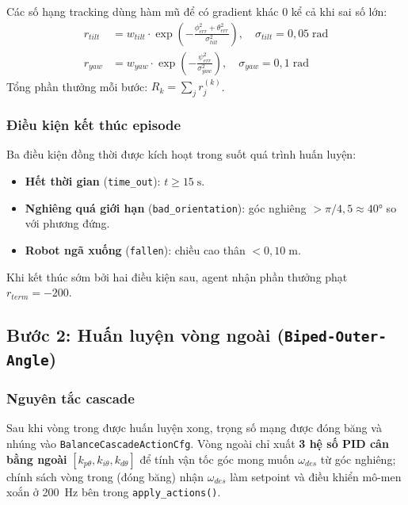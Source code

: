 Các số hạng tracking dùng hàm mũ để có gradient khác 0 kể cả khi sai
số lớn:
\begin{align}
    r_{tilt} &= w_{tilt} \cdot \exp\!\left(-\frac{\phi_{err}^2 + \theta_{err}^2}{\sigma_{tilt}^2}\right),
    \quad \sigma_{tilt} = 0{,}05\;\text{rad}
    \label{eq:rew_tilt_exp} \\
    r_{yaw}  &= w_{yaw} \cdot \exp\!\left(-\frac{\psi_{err}^2}{\sigma_{yaw}^2}\right),
    \quad \sigma_{yaw} = 0{,}1\;\text{rad}
    \label{eq:rew_yaw_exp}
\end{align}
Tổng phần thưởng mỗi bước: $R_k = \sum_j r_j^{(k)}$.

\subsubsection{Điều kiện kết thúc episode}

Ba điều kiện đồng thời được kích hoạt trong suốt quá trình huấn luyện:
\begin{itemize}
    \item \textbf{Hết thời gian} (\texttt{time\_out}): $t \geq 15\;\text{s}$.
    \item \textbf{Nghiêng quá giới hạn} (\texttt{bad\_orientation}):
    góc nghiêng $> \pi/4{,}5 \approx 40°$ so với phương đứng.
    \item \textbf{Robot ngã xuống} (\texttt{fallen}):
    chiều cao thân $< 0{,}10\;\text{m}$.
\end{itemize}
Khi kết thúc sớm bởi hai điều kiện sau, agent nhận phần thưởng phạt
$r_{term} = -200$.


\subsection{Bước 2: Huấn luyện vòng ngoài (\texttt{Biped-Outer-Angle})}

\subsubsection{Nguyên tắc cascade}

Sau khi vòng trong được huấn luyện xong, trọng số mạng được đóng băng
và nhúng vào \texttt{BalanceCascadeActionCfg}. Vòng ngoài chỉ xuất
\textbf{3 hệ số PID cân bằng ngoài}
$[k_{p\theta}, k_{i\theta}, k_{d\theta}]$ để tính vận tốc góc mong muốn
$\omega_{des}$ từ góc nghiêng; chính sách vòng trong (đóng băng) nhận
$\omega_{des}$ làm setpoint và điều khiển mô-men xoắn ở 200~Hz bên trong
\texttt{apply\_actions()}.

